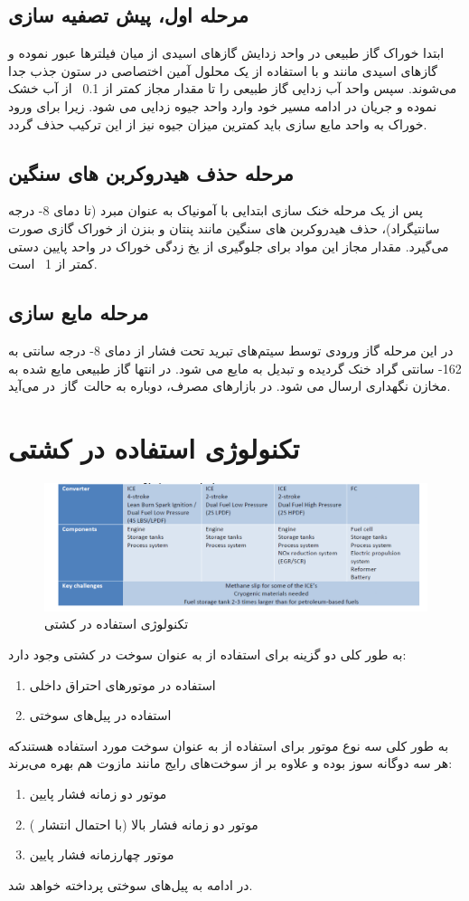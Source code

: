 \subsection{مرحله اول، پیش تصفیه سازی}
ابتدا خوراک گاز طبیعی در واحد زدایش گازهای اسیدی از میان فیلترها عبور نموده و گازهای اسیدی مانند
 و
با استفاده از یک محلول آمین اختصاصی در ستون جذب جدا می‌شوند.
سپس واحد آب زدایی گاز طبیعی را تا مقدار مجاز کمتر از 0.1
  از آب خشک نموده و جریان در ادامه مسیر خود وارد واحد جیوه زدایی می شود. زیرا برای ورود خوراک به واحد مایع سازی باید کمترین میزان جیوه نیز از این ترکیب حذف گردد.
\subsection{مرحله حذف هیدروکربن های سنگین}
پس از یک مرحله خنک سازی ابتدایی با آمونیاک به عنوان مبرد (تا دمای 
8-
 درجه سانتیگراد)، حذف هیدروکربن های سنگین مانند پنتان و بنزن از خوراک گازی صورت می‌گیرد. مقدار مجاز این مواد برای جلوگیری از یخ زدگی خوراک در واحد پایین دستی کمتر از 1 
  است.
\subsection{مرحله مایع سازی}
در این مرحله گاز ورودی توسط سیتم‌های تبرید تحت فشار از دمای 8- درجه سانتی به 162- سانتی گراد خنک گردیده و تبدیل به مایع می شود. در انتها گاز طبیعی مایع شده به مخازن نگهداری ارسال می شود. در بازارهای مصرف، 
 دوباره به حالت گاز در می‌آید. 
\section{تکنولوژی استفاده در کشتی}
\begin{figure}[!h]
	\centering
	\includegraphics[width=15cm]{Figures/LNG/using in Ship.png}
	\caption{تکنولوژی استفاده در کشتی}\label{using in ship}
\end{figure}
به طور کلی دو گزینه برای استفاده از 
 به عنوان سوخت در کشتی وجود دارد:
 \begin{enumerate}
 	\item استفاده در موتورهای احتراق داخلی 
 	\item استفاده در پیل‌های سوختی  
 \end{enumerate}
 به طور کلی سه نوع موتور برای استفاده از 
  به عنوان سوخت مورد استفاده هستندکه هر سه دوگانه سوز بوده و علاوه بر 
   از سوخت‌های رایج مانند مازوت هم بهره می‌برند:
    \begin{enumerate}
   	\item موتور دو زمانه فشار پایین
   	\item موتور دو زمانه فشار بالا (با احتمال انتشار )
   	\item موتور چهارزمانه فشار پایین
   \end{enumerate}
   در ادامه به پیل‌های سوختی پرداخته خواهد شد.
